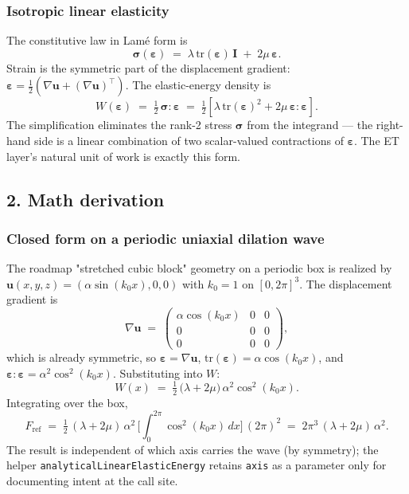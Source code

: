 \subsubsection{Isotropic linear elasticity}\label{phase15-elasticity}

The constitutive law in Lamé form is
\[
\boldsymbol{\sigma}(\boldsymbol{\varepsilon})
\;=\; \lambda\,\mathrm{tr}(\boldsymbol{\varepsilon})\,\mathbf{I}
   \;+\; 2\mu\,\boldsymbol{\varepsilon}.
\]
Strain is the symmetric part of the displacement gradient:
\(\boldsymbol{\varepsilon} = \tfrac12(\nabla\mathbf u + (\nabla\mathbf u)^\top)\).
The elastic-energy density is
\[
W(\boldsymbol{\varepsilon})
\;=\; \tfrac12\,\boldsymbol{\sigma}:\boldsymbol{\varepsilon}
\;=\; \tfrac12\!\left[\lambda\,\mathrm{tr}(\boldsymbol{\varepsilon})^2
                     + 2\mu\,\boldsymbol{\varepsilon}:\boldsymbol{\varepsilon}\right].
\]
The simplification eliminates the rank-2 stress
\(\boldsymbol{\sigma}\) from the integrand --- the right-hand side is a
linear combination of two scalar-valued contractions of
\(\boldsymbol{\varepsilon}\). The ET layer's natural unit of work is
exactly this form.

\subsection{2. Math derivation}\label{phase15-math}

\subsubsection{Closed form on a periodic uniaxial dilation wave}\label{phase15-closed}

The roadmap "stretched cubic block" geometry on a periodic box is
realized by
\(\mathbf u(x, y, z) = (\alpha\sin(k_0 x), 0, 0)\) with \(k_0 = 1\) on
\([0, 2\pi]^3\). The displacement gradient is
\[
\nabla \mathbf u
\;=\;
\begin{pmatrix}
\alpha\cos(k_0 x) & 0 & 0\\
0 & 0 & 0\\
0 & 0 & 0
\end{pmatrix},
\]
which is already symmetric, so
\(\boldsymbol{\varepsilon} = \nabla\mathbf u\),
\(\mathrm{tr}(\boldsymbol{\varepsilon}) = \alpha\cos(k_0 x)\), and
\(\boldsymbol{\varepsilon}:\boldsymbol{\varepsilon}
= \alpha^2\cos^2(k_0 x)\). Substituting into \(W\):
\[
W(x)
\;=\; \tfrac12\,\big(\lambda + 2\mu\big)\,\alpha^2\cos^2(k_0 x).
\]
Integrating over the box,
\[
F_{\mathrm{ref}}
\;=\; \tfrac12\,(\lambda + 2\mu)\,\alpha^2
\,\Big[\textstyle\int_0^{2\pi}\!\cos^2(k_0 x)\,dx\Big]
\,(2\pi)^2
\;=\; 2\pi^3\,(\lambda + 2\mu)\,\alpha^2.
\]
The result is independent of which axis carries the wave (by
symmetry); the helper
\passthrough{\lstinline!analyticalLinearElasticEnergy!} retains
\passthrough{\lstinline!axis!} as a parameter only for documenting
intent at the call site.

